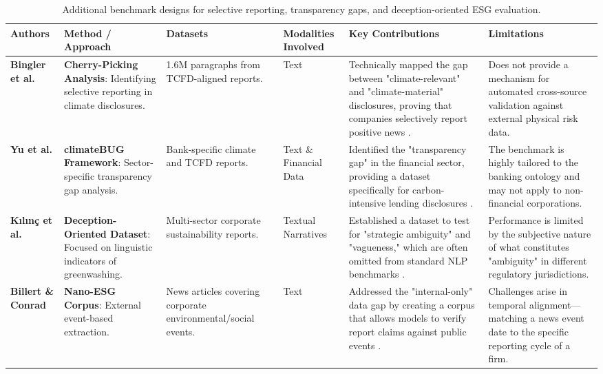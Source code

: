 \begin{landscape}
\begin{table}[p]
\centering
\caption{Additional benchmark designs for selective reporting, transparency gaps, and deception-oriented ESG evaluation.}
\label{tab:relatedwork-esg-benchmark-design-b}
\small
\renewcommand{\arraystretch}{1.2}
\begin{tabularx}{\linewidth}{|p{1.8cm}|p{3cm}|p{3cm}|p{1.8cm}|X|X|}
\hline
Authors & Method / Approach & Datasets & Modalities Involved & Key Contributions & Limitations \\ \hline
\textbf{Bingler et al.}  \parencite{julia_bingler_268445e3} & \textbf{Cherry-Picking Analysis}: Identifying selective reporting in climate disclosures. & 1.6M paragraphs from TCFD-aligned reports. & Text & Technically mapped the gap between "climate-relevant" and "climate-material" disclosures, proving that companies selectively report positive news  \parencite{julia_bingler_268445e3}. & Does not provide a mechanism for automated cross-source validation against external physical risk data. \\ \hline
\textbf{Yu et al.}  \parencite{yinan_yu_e282fd98} & \textbf{climateBUG Framework}: Sector-specific transparency gap analysis. & Bank-specific climate and TCFD reports. & Text \& Financial Data & Identified the "transparency gap" in the financial sector, providing a dataset specifically for carbon-intensive lending disclosures  \parencite{yinan_yu_e282fd98}. & The benchmark is highly tailored to the banking ontology and may not apply to non-financial corporations. \\ \hline
\textbf{Kılınç et al.}  \parencite{yavuz_k_l_n__64e32f80} & \textbf{Deception-Oriented Dataset}: Focused on linguistic indicators of greenwashing. & Multi-sector corporate sustainability reports. & Textual Narratives & Established a dataset to test for "strategic ambiguity" and "vagueness," which are often omitted from standard NLP benchmarks  \parencite{yavuz_k_l_n__64e32f80}. & Performance is limited by the subjective nature of what constitutes "ambiguity" in different regulatory jurisdictions. \\ \hline
\textbf{Billert \& Conrad}  \parencite{fabian_billert_a5fbb687} & \textbf{Nano-ESG Corpus}: External event-based extraction. & News articles covering corporate environmental/social events. & Text & Addressed the "internal-only" data gap by creating a corpus that allows models to verify report claims against public events  \parencite{fabian_billert_a5fbb687}. & Challenges arise in temporal alignment—matching a news event date to the specific reporting cycle of a firm. \\ \hline

\end{tabularx}
\end{table}
\end{landscape}
